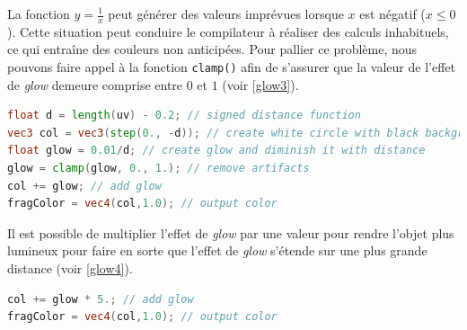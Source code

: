 La fonction $y = \frac{1}{x}$ peut générer des valeurs imprévues lorsque $x$ est négatif ($x\leq0$). Cette situation peut conduire le compilateur à réaliser des calculs inhabituels, ce qui entraîne des couleurs non anticipées. Pour pallier ce problème, nous pouvons faire appel à la fonction \lstinline{clamp()} afin de s'assurer que la valeur de l'effet de \textit{glow} demeure comprise entre $0$ et $1$ (voir \ref{glow3}).

\begin{minipage}{\linewidth}
\begin{lstlisting}[language=GLSL, caption=Glow,captionpos=b,frame=single]
float d = length(uv) - 0.2; // signed distance function
vec3 col = vec3(step(0., -d)); // create white circle with black background
float glow = 0.01/d; // create glow and diminish it with distance
glow = clamp(glow, 0., 1.); // remove artifacts
col += glow; // add glow
fragColor = vec4(col,1.0); // output color
\end{lstlisting}
\end{minipage}



Il est possible de multiplier l'effet de \textit{glow} par une valeur pour rendre l'objet plus lumineux pour faire en sorte que l'effet de \textit{glow} s'étende sur une plus grande distance (voir \ref{glow4}).

\begin{minipage}{\linewidth}
\begin{lstlisting}[language=GLSL, caption=Intensité du glow,captionpos=b,frame=single] 
col += glow * 5.; // add glow
fragColor = vec4(col,1.0); // output color
\end{lstlisting}
\end{minipage}

